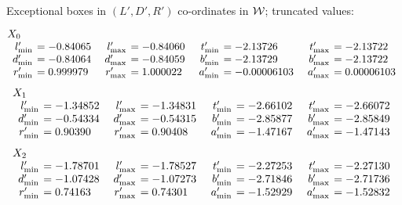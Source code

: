 \endproclaim

 
 Exceptional
boxes in $(L',D',R')$ co-ordinates in ${\cal W}$; truncated values:
 
\begin{small}
$$
\begin{array}{rlrlrlrl}
\noalign{\noindent $X_0$}
\noalign{\vskip2pt}
l'_{\rm min} &\hskip-6pt = -0.84065&\enspace l'_{\rm max} &\hskip-6pt = -0.84060&\enspace
t'_{\rm min}&\hskip-6pt = -2.13726&\enspace t'_{\rm max}&\hskip-6pt = -2.13722\\
 d'_{\rm min}&\hskip-6pt = -0.84064& d'_{\rm max} &\hskip-6pt = -0.84059&
b'_{\rm min}&\hskip-6pt = -2.13729& b'_{\rm max} &\hskip-6pt = -2.13722\\
r'_{\rm min} &\hskip-6pt = 0.999979& r'_{\rm max} &\hskip-6pt = 1.000022&
a'_{\rm min}&\hskip-6pt = -0.00006103& a'_{\rm max}&\hskip-6pt = 0.00006103\end{array}
$$
$$
\begin{array}{rlrlrlrl}
\noalign{\vskip2pt}
\noalign{ \noindent $X_1$}
\noalign{\vskip2pt}
l'_{\rm min} &\hskip-6pt = -1.34852&\enspace  l'_{\rm max} &\hskip-6pt = -1.34831&\enspace 
t'_{\rm min} &\hskip-6pt = -2.66102&\enspace  t'_{\rm max} &\hskip-6pt = -2.66072\\
d'_{\rm min} &\hskip-6pt = -0.54334& d'_{\rm max}
&\hskip-6pt = -0.54315&   b'_{\rm min} &\hskip-6pt = -2.85877&  b'_{\rm max} &\hskip-6pt = -2.85849\\
r'_{\rm min} &\hskip-6pt = 0.90390& 
r'_{\rm max} &\hskip-6pt = 0.90408&   a'_{\rm min} &\hskip-6pt = -1.47167&  a'_{\rm max} &\hskip-6pt = -1.47143
\end{array}
$$
$$
\begin{array}{rlrlrlrl}
\noalign{\vskip2pt}
\noalign{\noindent $X_2$}
\noalign{\vskip2pt}
l'_{\rm min} &\hskip-6pt =  -1.78701&\enspace   l'_{\rm max} &\hskip-6pt =  -1.78527&\enspace  
t'_{\rm min} &\hskip-6pt =  -2.27253&\enspace   t'_{\rm max} &\hskip-6pt =  -2.27130\\
d'_{\rm min} &\hskip-6pt =  -1.07428& d'_{\rm max}
&\hskip-6pt =  -1.07273&   b'_{\rm min} &\hskip-6pt =  -2.71846&  b'_{\rm max} &\hskip-6pt =  -2.71736\\
r'_{\rm min} &\hskip-6pt =  0.74163& 
r'_{\rm max} &\hskip-6pt =  0.74301&   a'_{\rm min} &\hskip-6pt =  -1.52929&  a'_{\rm max} &\hskip-6pt =  -1.52832
\end{array}
$$


\end{small}
